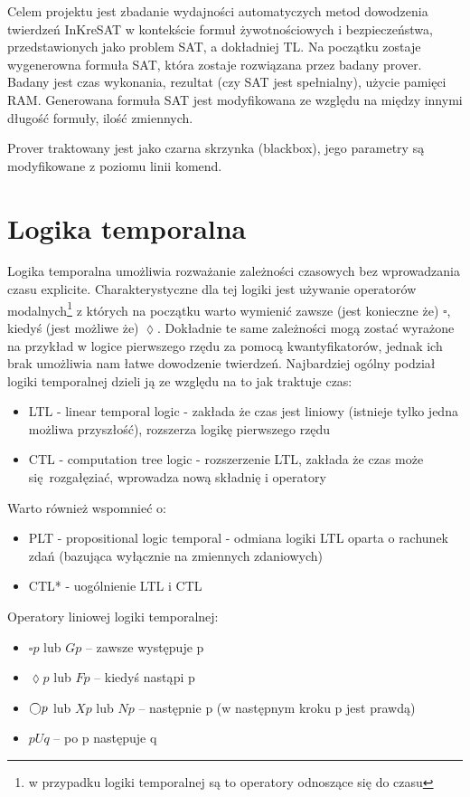 \documentclass[a4paper,12pt]{article}
\begin{document}
Celem projektu jest zbadanie wydajności automatyczych metod dowodzenia twierdzeń InKreSAT w kontekście formuł żywotnościowych i bezpieczeństwa, przedstawionych jako problem \gls{SAT}, a dokładniej \gls{TL}. Na początku zostaje wygenerowna formuła \gls{SAT}, która zostaje rozwiązana przez badany prover. Badany jest czas wykonania, rezultat (czy \gls{SAT} jest spełnialny), użycie pamięci RAM.  Generowana formuła \gls{SAT} jest modyfikowana ze względu na między innymi długość formuły, ilość zmiennych.

Prover traktowany jest jako czarna skrzynka (blackbox), jego parametry są modyfikowane z poziomu linii komend.

\section{Logika temporalna}

Logika temporalna umożliwia rozważanie zależności czasowych bez wprowadzania czasu explicite. Charakterystyczne dla tej logiki jest używanie operatorów modalnych\footnote{w przypadku logiki temporalnej są to operatory odnoszące się do czasu} z których na początku warto wymienić zawsze (jest konieczne że) $\square$, kiedyś (jest możliwe że) $\lozenge$. Dokładnie te same zależności mogą zostać wyrażone na przykład w logice pierwszego rzędu za pomocą kwantyfikatorów, jednak ich brak umożliwia nam łatwe dowodzenie twierdzeń. Najbardziej ogólny podział logiki temporalnej dzieli ją ze względu na to jak traktuje czas:
\begin{itemize}
  \item LTL - linear temporal logic - zakłada że czas jest liniowy (istnieje tylko jedna możliwa przyszłość), rozszerza logikę pierwszego rzędu
  \item CTL - computation tree logic - rozszerzenie LTL, zakłada że czas może się rozgałęziać, wprowadza nową składnię i operatory
\end{itemize}

Warto również wspomnieć o:
\begin{itemize}
  \item PLT - propositional logic temporal - odmiana logiki LTL oparta o rachunek zdań (bazująca wyłącznie na zmiennych zdaniowych)
  \item CTL* - uogólnienie LTL i CTL
\end{itemize}

Operatory liniowej logiki temporalnej:
\begin{itemize}
  \item $\square p$ lub $G p$ -- zawsze występuje p
  \item $\lozenge p$ lub $F p$ -- kiedyś nastąpi p
  \item $\varbigcirc p$ lub $X p$ lub $N p$ -- następnie p (w następnym kroku p jest prawdą)
  \item $p U q$ -- po p następuje q
\end{itemize}
\end{document}
